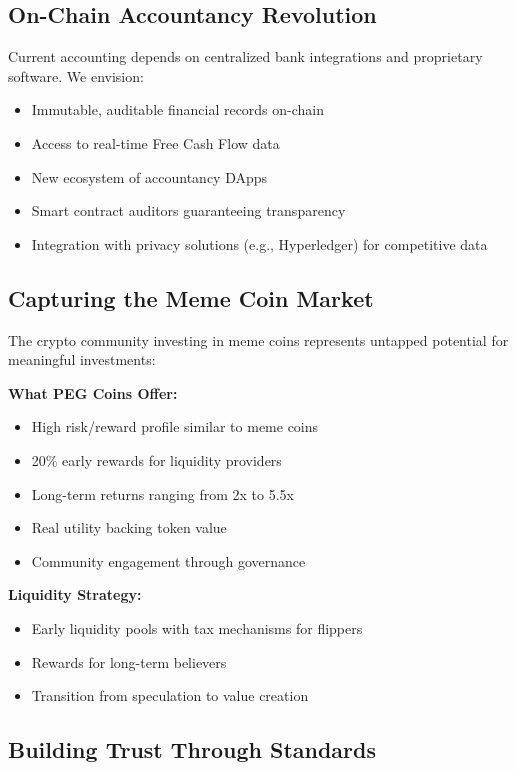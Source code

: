 \documentclass[conference]{IEEEtran}
\begin{document}
\subsection{On-Chain Accountancy Revolution}

Current accounting depends on centralized bank integrations and proprietary software. We envision:
\begin{itemize}
    \item Immutable, auditable financial records on-chain
    \item Access to real-time Free Cash Flow data
    \item New ecosystem of accountancy DApps
    \item Smart contract auditors guaranteeing transparency
    \item Integration with privacy solutions (e.g., Hyperledger) for competitive data
\end{itemize}

\subsection{Capturing the Meme Coin Market}

The crypto community investing in meme coins represents untapped potential for meaningful investments:

\textbf{What PEG Coins Offer:}
\begin{itemize}
    \item High risk/reward profile similar to meme coins
    \item 20\% early rewards for liquidity providers
    \item Long-term returns ranging from 2x to 5.5x
    \item Real utility backing token value
    \item Community engagement through governance
\end{itemize}

\textbf{Liquidity Strategy:}
\begin{itemize}
    \item Early liquidity pools with tax mechanisms for flippers
    \item Rewards for long-term believers
    \item Transition from speculation to value creation
\end{itemize}

\subsection{Building Trust Through Standards}
\end{document}

